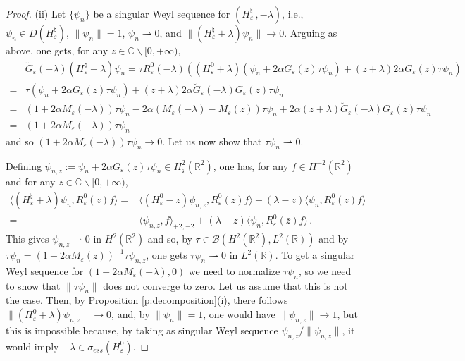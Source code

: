 \documentclass[a4paper,11pt,reqno]{amsart}
\theoremstyle{definition}
\numberwithin{equation}{section}
\newcommand{\CO}{\mathbb C}
\newcommand{\RE}{\mathbb R}
\newcommand{\Bou}{\mathscr{B}}
\newcommand{\ve}{\varepsilon}
\newcommand{\bosfer}{{\natural}}
\begin{document}
\begin{proof}
(ii) Let $\{\psi_n\}$ be a singular Weyl  sequence for $( H^\bosfer_\ve\,,-\lambda)$, i.e., $\psi_n\in D( H^\bosfer_\ve)$,  $\|\psi_n\|= 1$, $\psi_n \rightharpoonup 0$, and $\| (H^\bosfer_\ve +\lambda )\psi_n \| \to 0$. Arguing as above, one gets, for any $z\in\CO\backslash[0,+\infty)$,
\begin{align*}
&\breve G_{\ve}(-\lambda)(H^\bosfer_\ve +\lambda ) \psi_{n}=
\tau R^{0}_{\ve}(-\lambda)\left((H^{0}_{\ve} +\lambda) (\psi_{n}+2\alpha G_{\ve}(z)\tau\psi_{n})+(z+\lambda) 2\alpha G_{\ve}(z)\tau\psi_{n}\right)
\\=&
\tau  (\psi_n+2\alpha G_{\ve}(z)\tau\psi_{n})
 + (z+\lambda) 2\alpha \breve G_{\ve}(-\lambda)G_{\ve}(z)\tau\psi_{n}
\\
=&(1+2\alpha M_{\ve}(-\lambda))\tau\psi_{n}-2\alpha(M_{\ve}(-\lambda)-M_{\ve}(z))\tau\psi_{n}+2\alpha(z+\lambda)\breve G_{\ve}(-\lambda)G_{\ve}(z)\tau\psi_{n}
\\
=&(1+2\alpha M_{\ve}(-\lambda))\tau\psi_{n} 
\end{align*}
and so $(1+2\alpha M_{\ve}(-\lambda))\tau\psi_{n}\to 0$. Let us now show that $\tau\psi_{n}\rightharpoonup 0$.\par
Defining $\psi_{n,z}:=\psi_{n}+2\alpha G_{\ve}(z)\tau\psi_{n}\in H_{\bosfer}^{2}(\RE^{2})$,  one has, for
any $f\in H^{-2}(\RE^{2} )$ and for any $z\in\CO\backslash[0,+\infty)$,
\begin{align*}
\langle(H^\bosfer_\ve+\lambda)\psi_{n},R^{0}_{\ve}(\bar z)f\rangle 
=&\langle(H^{0}_{\ve}-z)\psi_{n,z},R^{0}_{\ve}(\bar z)f\rangle +(\lambda-z)\langle\psi_{n}, R^{0}_{\ve}(\bar z)f\rangle \\
=&\langle\psi_{n,z},f\rangle_{+2,-2}+(\lambda-z)\langle\psi_{n}, R^{0}_{\ve}(\bar z)f\rangle \,.
\end{align*}
This gives $\psi_{n,z}\rightharpoonup 0$ in $H^{2}(\RE^{2})$ and so, by $\tau\in\Bou(H^{2}(\RE^{2}),L^{2}(\RE))$ and by $\tau\psi_{n}=(1+2\alpha M_{\ve}(z))^{-1}\tau\psi_{n,z}$, one gets $\tau\psi_{n}\rightharpoonup 0$ in $L^{2}(\RE)$. To get a singular Weyl sequence for 
$(1  + 2\alpha M_{\ve}(-\lambda),0)$ we need to normalize $\tau\psi_{n}$, so we need to show that $\|\tau\psi_{n}\|$ does not converge to zero. Let us assume that this is not the case. Then, by 
Proposition \ref{p:decomposition}(i), there follows  $\|(H^{0}_\ve+\lambda) \psi_{n,z}\|\to 0$, and, by $\|\psi_{n}\|=1$, one would have $\|\psi_{n,z}\| \to  1$, but this is impossible because, by taking as singular Weyl sequence $\psi_{n,z}/ \|\psi_{n,z}\|$, it would imply $-\lambda \in \sigma_{ess}(H^{0}_{\ve})$. 

\end{proof}
\end{document}
